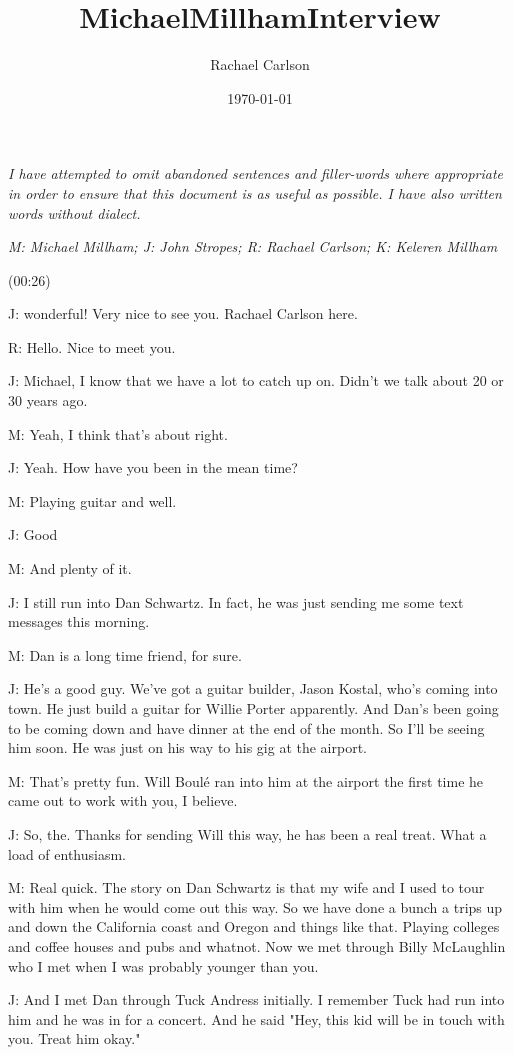 \documentclass[11pt]{article}
\author{Rachael Carlson}
\date{\today}
\title{MichaelMillhamInterview}
\begin{document}
\maketitle
\tableofcontents

\emph{I have attempted to omit abandoned sentences and filler-words where appropriate in order to ensure that this document is as useful as possible. I have also written words without dialect.}

\emph{M: Michael Millham; J: John Stropes; R: Rachael Carlson; K: Keleren Millham}

(00:26)

J: wonderful! Very nice to see you. Rachael Carlson here.

R: Hello. Nice to meet you.

J: Michael, I know that we have a lot to catch up on. Didn't we talk about 20 or 30 years ago. 

M: Yeah, I think that's about right.

J: Yeah. How have you been in the mean time?

M: Playing guitar and well.

J: Good

M: And plenty of it.

J: I still run into Dan Schwartz. In fact, he was just sending me some text messages this morning.

M: Dan is a long time friend, for sure.  

J: He's a good guy. We've got a guitar builder, Jason Kostal, who's coming into town. He just build a guitar for Willie Porter apparently. And Dan's been going to be coming down and have dinner at the end of the month. So I'll be seeing him soon. He was just on his way to his gig at the airport.

M: That's pretty fun. Will Boulé ran into him at the airport the first time he came out to work with you, I believe.

J: So, the. Thanks for sending Will this way, he has been a real treat. What a load of enthusiasm.

M: Real quick. The story on Dan Schwartz is that my wife and I used to tour with him when he would come out this way. So we have done a bunch a trips up and down the California coast and Oregon and things like that. Playing colleges and coffee houses and pubs and whatnot. Now we met through Billy McLaughlin who I met when I was probably younger than you. 

J: And I met Dan through Tuck Andress initially. I remember Tuck had run into him and he was in for a concert. And he said "Hey, this kid will be in touch with you. Treat him okay."
\end{document}
